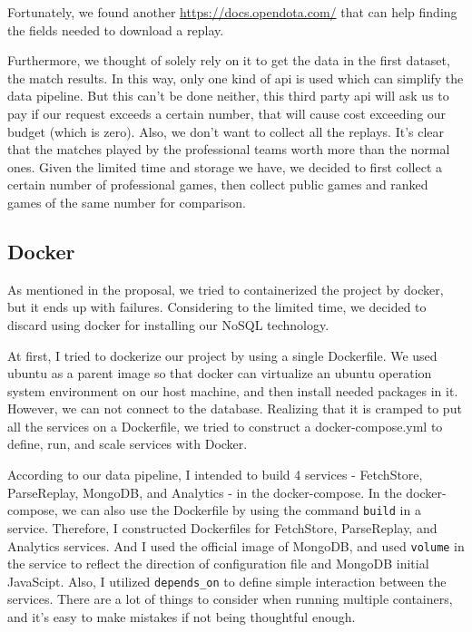 \documentclass{article}
\newcommand{\codeinline}[1]{
    \texttt{#1}
}
\begin{document}
Fortunately, we found another \href{third-party api}{https://docs.opendota.com/} that can help finding the fields needed to download a replay.

Furthermore, we thought of solely rely on it to get the data in the first dataset, the match results. In this way, only one kind of api is used which can simplify the data pipeline. But this can't be done neither, this third party api will ask us to pay if our request exceeds a certain number, that will cause cost exceeding our budget (which is zero).
Also, we don't want to collect all the replays. It's clear that the matches played by the professional teams worth more than the normal ones.
Given the limited time and storage we have, we decided to first collect a certain number of professional games, then collect public games and ranked games of the same number for comparison.

\subsection{Docker}

As mentioned in the proposal, we tried to containerized the project by docker, but it ends up with failures. Considering to the limited time, we decided to discard using docker for installing our NoSQL technology.

At first, I tried to dockerize our project by using a single Dockerfile.
We used ubuntu as a parent image so that docker can virtualize an ubuntu operation system environment on our host machine, and then install needed packages in it.
However, we can not connect to the database.
Realizing that it is cramped to put all the services on a Dockerfile, we tried to construct a docker-compose.yml to define, run, and scale services with Docker.

According to our data pipeline, I intended to build 4 services - FetchStore, ParseReplay, MongoDB, and Analytics - in the docker-compose.
In the docker-compose, we can also use the Dockerfile by using the command \codeinline{build} in a service.
Therefore, I constructed Dockerfiles for FetchStore, ParseReplay, and Analytics services.
And I used the official image of MongoDB, and used \codeinline{volume} in the service to reflect the direction of configuration file and MongoDB initial JavaScipt.
Also, I utilized \codeinline{depends_on} to define simple interaction between the services.
There are a lot of things to consider when running multiple containers, and it's easy to make mistakes if not being thoughtful enough.
\end{document}
